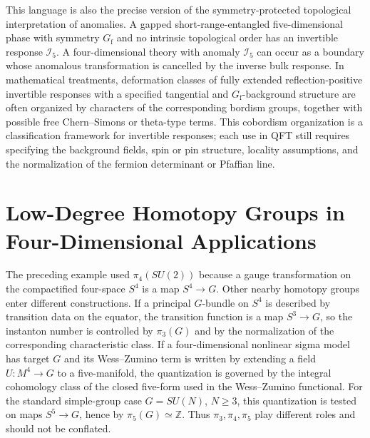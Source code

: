 This language is also the precise version of the symmetry-protected
topological interpretation of anomalies.  A gapped short-range-entangled
five-dimensional phase with symmetry \(G_{\mathrm f}\) and no intrinsic
topological order has an invertible response \(\mathcal I_5\).  A
four-dimensional theory with anomaly \(\mathcal I_5\) can occur as a boundary
whose anomalous transformation is cancelled by the inverse bulk response.  In
mathematical treatments, deformation classes of fully extended
reflection-positive invertible responses with a specified tangential and
\(G_{\mathrm f}\)-background structure are often organized by characters of
the corresponding bordism groups, together with possible free Chern--Simons or
theta-type terms.  This cobordism organization is a classification framework
for invertible responses; each use in QFT still requires specifying the
background fields, spin or pin structure, locality assumptions, and the
normalization of the fermion determinant or Pfaffian line.

\section{Low-Degree Homotopy Groups in Four-Dimensional Applications}

The preceding example used \(\pi_4(SU(2))\) because a gauge transformation on
the compactified four-space \(S^4\) is a map \(S^4\to G\).  Other nearby
homotopy groups enter different constructions.  If a principal \(G\)-bundle on
\(S^4\) is described by transition data on the equator, the transition function
is a map \(S^3\to G\), so the instanton number is controlled by \(\pi_3(G)\)
and by the normalization of the corresponding characteristic class.  If a
four-dimensional nonlinear sigma model has target \(G\) and its Wess--Zumino
term is written by extending a field \(U:M^4\to G\) to a five-manifold, the
quantization is governed by the integral cohomology class of the closed
five-form used in the Wess--Zumino functional.  For the standard simple-group
case \(G=SU(N)\), \(N\ge3\), this quantization is tested on maps
\(S^5\to G\), hence by \(\pi_5(G)\simeq\mathbb Z\).  Thus
\(\pi_3,\pi_4,\pi_5\) play different roles and should not be conflated.

